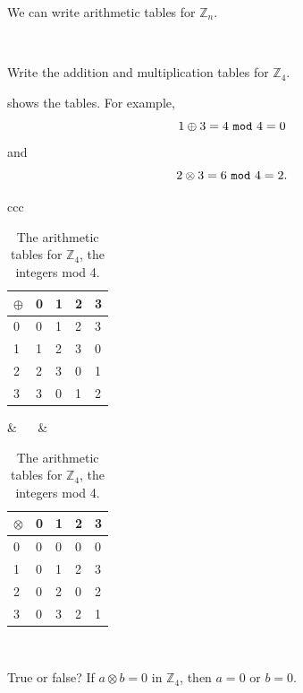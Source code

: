 We can write arithmetic tables for $\mathbb{Z}_n$.

\begin{exam}
~
    \begin{apart}
        \item Write the addition and multiplication tables for $\mathbb{Z}_4$.
            \begin{soln}
                 shows the tables.  For example, $$1 \oplus 3 = 4~\texttt{mod}~4 = 0$$ and $$2\otimes 3  = 6~\texttt{mod}~4 = 2.$$
            \begin{table}[hbtp]
                \centering
                \begin{tabular}{ccc}
                    \begin{tabular} {l|llll} 
                        $\oplus$ & 0 & 1 & 2 & 3\\ \hline  
                        0 & 0 & 1 & 2 & 3\\ 
                        1 & 1 & 2 & 3 & 0 \\
                        2 & 2 & 3 & 0 & 1 \\ 
                        3 & 3 & 0 & 1 & 2 \\
                    \end{tabular}
                & ~\hspace{.5in}~ & 
                    \begin{tabular} {l|llll} 
                        $\otimes$ & 0 & 1 & 2 & 3 \\ \hline 
                        0 & 0 & 0 & 0 & 0\\
                        1 & 0 & 1 & 2 & 3\\ 
                        2 & 0 & 2 & 0 & 2\\ 
                        3 & 0 & 3 & 2 & 1\\ 
                    \end{tabular}
                \\
                \end{tabular}
                \caption{The arithmetic tables for $\mathbb{Z}_4$, the integers mod 4.}
                \label{table_mod4_arithm}
            \end{table}
            \end{soln}
        \item True or false?  If $a \otimes b = 0$ in $\mathbb{Z}_4$, then $a = 0$ or $b = 0$.
            \begin{soln}

\end{soln}
\end{apart}
\end{exam}
